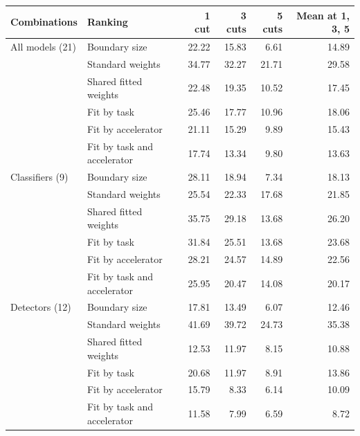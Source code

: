 \begin{tabular}{@{}llrrrr@{}}
\toprule
Combinations & Ranking & 1 cut & 3 cuts & 5 cuts & Mean at 1, 3, 5 \\
\midrule
All models (21) & Boundary size & 22.22 & 15.83 & 6.61 & 14.89 \\
 & Standard weights & 34.77 & 32.27 & 21.71 & 29.58 \\
 & Shared fitted weights & 22.48 & 19.35 & 10.52 & 17.45 \\
 & Fit by task & 25.46 & 17.77 & 10.96 & 18.06 \\
 & Fit by accelerator & 21.11 & 15.29 & 9.89 & 15.43 \\
 & Fit by task and accelerator & 17.74 & 13.34 & 9.80 & 13.63 \\
\midrule
Classifiers (9) & Boundary size & 28.11 & 18.94 & 7.34 & 18.13 \\
 & Standard weights & 25.54 & 22.33 & 17.68 & 21.85 \\
 & Shared fitted weights & 35.75 & 29.18 & 13.68 & 26.20 \\
 & Fit by task & 31.84 & 25.51 & 13.68 & 23.68 \\
 & Fit by accelerator & 28.21 & 24.57 & 14.89 & 22.56 \\
 & Fit by task and accelerator & 25.95 & 20.47 & 14.08 & 20.17 \\
\midrule
Detectors (12) & Boundary size & 17.81 & 13.49 & 6.07 & 12.46 \\
 & Standard weights & 41.69 & 39.72 & 24.73 & 35.38 \\
 & Shared fitted weights & 12.53 & 11.97 & 8.15 & 10.88 \\
 & Fit by task & 20.68 & 11.97 & 8.91 & 13.86 \\
 & Fit by accelerator & 15.79 & 8.33 & 6.14 & 10.09 \\
 & Fit by task and accelerator & 11.58 & 7.99 & 6.59 & 8.72 \\
\bottomrule
\end{tabular}
